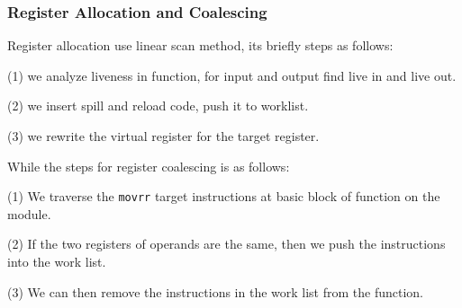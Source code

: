 \subsubsection{Register Allocation and Coalescing}

Register allocation use linear scan method, its briefly steps as follows:

(1) we analyze liveness in function, for input and output find live in and live out.

(2) we insert spill and reload code, push it to worklist.

(3) we rewrite the virtual register for the target register.

While the steps for register coalescing is as follows:

(1) We traverse the \texttt{movrr} target instructions at basic block of function on the module.

(2) If the two registers of operands are the same, then we push the instructions into the work list.

(3) We can then remove the instructions in the work list from the function.